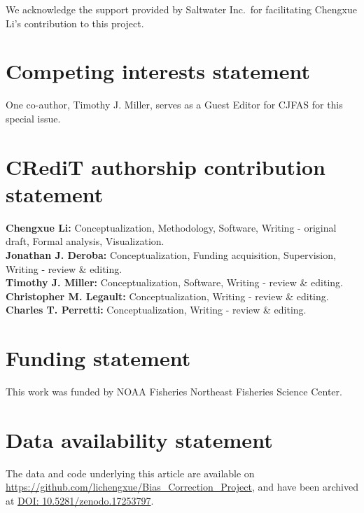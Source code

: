 \documentclass[
  12pt,
]{article}
\begin{document}
We acknowledge the support provided by Saltwater Inc.~for facilitating
Chengxue Li's contribution to this project.

\hypertarget{competing-interests-statement}{%
\section{Competing interests
statement}\label{competing-interests-statement}}

One co-author, Timothy J. Miller, serves as a Guest Editor for CJFAS for
this special issue.

\hypertarget{credit-authorship-contribution-statement}{%
\section{CRediT authorship contribution
statement}\label{credit-authorship-contribution-statement}}

\textbf{Chengxue Li:} Conceptualization, Methodology, Software, Writing
- original draft, Formal analysis, Visualization.\\
\textbf{Jonathan J. Deroba:} Conceptualization, Funding acquisition,
Supervision, Writing - review \& editing.\\
\textbf{Timothy J. Miller:} Conceptualization, Software, Writing -
review \& editing.\\
\textbf{Christopher M. Legault:} Conceptualization, Writing - review \&
editing.\\
\textbf{Charles T. Perretti:} Conceptualization, Writing - review \&
editing.

\hypertarget{funding-statement}{%
\section{Funding statement}\label{funding-statement}}

This work was funded by NOAA Fisheries Northeast Fisheries Science
Center.

\hypertarget{data-availability-statement}{%
\section{Data availability
statement}\label{data-availability-statement}}

The data and code underlying this article are available on
\url{https://github.com/lichengxue/Bias_Correction_Project}, and have
been archived at \href{https://doi.org/10.5281/zenodo.17253797}{DOI:
10.5281/zenodo.17253797}.
\end{document}
